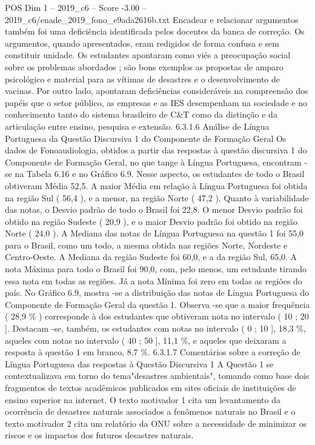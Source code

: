 \begin{textsample}{POS Dim 1 – 2019\_c6 – Score -3.00 – 2019\_c6/enade\_2019\_fono\_e9ada2616b.txt}
Encadear e relacionar argumentos também foi uma deficiência identificada pelos docentes da banca de correção.
Os argumentos, quando apresentados, eram redigidos de forma confusa e sem constituir unidade.
Os estudantes apontaram como viés a preocupação social sobre os problemas abordados ; são bons exemplos as propostas de amparo psicológico e material para as vítimas de desastres e o desenvolvimento de vacinas.
Por outro lado, apontaram deficiências consideráveis na compreensão dos papéis que o setor público, as empresas e as IES desempenham na sociedade e no conhecimento tanto do sistema brasileiro de C\&T como da distinção e da articulação entre ensino, pesquisa e extensão. 6.3.1.6 Análise de Língua Portuguesa da Questão Discursiva 1 do Componente de Formação Geral Os dados de Fonoaudiologia, obtidos a partir das respostas à questão discursiva 1 do Componente de Formação Geral, no que tange à Língua Portuguesa, encontram -se na Tabela 6.16 e no Gráfico 6.9.
Nesse aspecto, os estudantes de todo o Brasil obtiveram Média 52,5.
A maior Média em relação à Língua Portuguesa foi obtida na região Sul ( 56,4 ), e a menor, na região Norte ( 47,2 ).
Quanto à variabilidade das notas, o Desvio padrão de todo o Brasil foi 22,8.
O menor Desvio padrão foi obtido na região Sudeste ( 20,9 ), e o maior Desvio padrão foi obtido na região Norte ( 24,0 ).
A Mediana das notas de Língua Portuguesa na questão 1 foi 55,0 para o Brasil, como um todo, a mesma obtida nas regiões Norte, Nordeste e Centro-Oeste.
A Mediana da região Sudeste foi 60,0, e a da região Sul, 65,0.
A nota Máxima para todo o Brasil foi 90,0, com, pelo menos, um estudante tirando essa nota em todas as regiões.
Já a nota Mínima foi zero em todas as regiões do país.
No Gráfico 6.9, mostra -se a distribuição das notas de Língua Portuguesa do Componente de Formação Geral da questão 1.
Observa -se que a maior frequência ( 28,9 \% ) corresponde à dos estudantes que obtiveram nota no intervalo ( 10 ; 20 ].
Destacam -se, também, os estudantes com notas no intervalo ( 0 ; 10 ], 18,3 \%, aqueles com notas no intervalo ( 40 ; 50 ], 11,1 \%, e aqueles que deixaram a resposta à questão 1 em branco, 8,7 \%. 6.3.1.7 Comentários sobre a correção de Língua Portuguesa das respostas à Questão Discursiva 1 A Questão 1 se contextualizava em torno do tema"desastres ambientais", tomando como base dois fragmentos de textos acadêmicos publicados em sites oficiais de instituições de ensino superior na internet.
O texto motivador 1 cita um levantamento da ocorrência de desastres naturais associados a fenômenos naturais no Brasil e o texto motivador 2 cita um relatório da ONU sobre a necessidade de minimizar os riscos e os impactos dos futuros desastres naturais.

\end{textsample}
